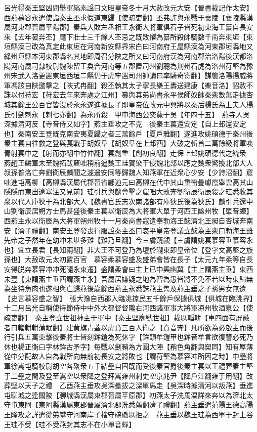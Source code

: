 呂光得秦王堅凶問舉軍縞素諡曰文昭皇帝冬十月大赦改元大安【晉書載記作太安】　西燕慕容永遣使詣秦主丕求假道東歸【使疏吏翻】丕弗許與永戰于襄陵【襄陵縣漢屬河東郡晉屬平陽郡】秦兵大敗左丞相王永衛大將軍俱石子皆死初東海王纂自長安來【去年纂奔丕】麾下壯士三千餘人丕忌之既敗懼為纂所殺帥騎數千南奔東垣【東垣縣漢已改為真定此東垣在河南新安縣界宋白曰河南府王屋縣漢為河東郡垣縣地又絳州垣縣本河東郡縣名其地即周召分陜之所又曰河南府漢為河南郡治洛陽後漢都洛陽河南屬司隸校尉魏陳留王奐合河南等五郡置司州劉聰為荆州石虎為洛州苻堅為豫州宋武入洛更置東垣西垣二縣仍于虎牢置司州帥讀曰率騎奇寄翻】謀襲洛陽揚威將軍馮該自陜邀擊之【陜式冉翻】殺丕執其太子寧長樂王夀送建康【樂音洛】詔赦不誅以付苻宏【苻宏去年來奔處之江州】纂與其弟尚書永平侯師奴帥秦衆數萬走據杏城其餘王公百官皆沒於永永遂進據長子即皇帝位改元中興將以秦后楊氏為上夫人楊氏引劍刺永【刺七亦翻】為永所殺　甲申海西公奕薨于吳【年四十五】　燕寺人吳深據清河反【寺音侍又如字】燕主垂攻之不克　後秦主萇還安定【自上邽還安定也】秦南安王登既克南安夷夏歸之者三萬餘戶【夏戶雅翻】遂進攻姚碩德于秦州後秦主萇自往救之登與萇戰于胡奴阜【胡奴阜在上邽西】大破之斬首二萬餘級將軍啖青射萇中之【射而亦翻中竹仲翻】萇創重【創初良翻】走保上邽姚碩德代之統衆　燕趙王麟軍未至魏拓跋窟咄稍前逼魏王珪賀染干侵魏北部以應之魏衆驚擾北部大人叔孫普洛亡奔劉衛辰麟聞之遽遣安同等歸魏人知燕軍在近衆心少安【少詩沼翻】窟咄進屯高柳【高柳縣漢屬代郡晉省酈道元曰高柳在代中其山重巒疊巘霞舉雲高其山隱隱而東出遼塞注又見前】珪引兵與麟會擊之窟咄大敗奔劉衛辰衛辰殺之珪悉收其衆以代人庫狄干為北部大人【魏書官氏志次南諸部有庫狄氏後為狄氏】麟引兵還中山劉衛辰居朔方士馬甚盛後秦主萇以衛辰為大將軍大單于河西王幽州牧【單音蟬】西燕主永以衛辰為大將軍朔州牧十一月秦尚書寇遺奉勃海王懿濟北王昶自杏城奔南安【濟子禮翻】南安王登發喪行服諡秦主丕曰哀平皇帝登議立懿為主衆曰勃海王雖先帝之子然年在幼冲未堪多難【難乃旦翻】今三虜窺覦【三虜謂姚萇慕容垂慕容永也】宜立長君【長知兩翻】非大王不可登乃為壇於隴東即皇帝位【登字文高堅之族孫也】大赦改元太初置百官　慕容柔慕容盛及盛弟會皆在長子【太元九年柔等自長安得脱奔慕容冲冲死隨永東遷】盛謂柔會曰主上已中興幽冀【主上謂燕主垂】東西未壹【東謂燕主垂西謂燕主永】吾屬居嫌疑之地為智為愚皆將不免不若以時東歸無為坐待魚肉也遂相與亡歸燕後歲餘西燕主永悉誅燕主雋及燕主垂之子孫男女無遺【史言慕容盛之智】　張大豫自西郡入臨洮掠民五千餘戶保據俱城【俱城在臨洮界】　十二月呂光自稱使持節侍中中外大都督督隴右河西諸軍事大將軍凉州牧酒泉公【使疏吏翻】　秦主登立世祖神主于軍中【秦主堅廟號世祖】載以輜軿【車四面有屏蔽者曰輜軿軿蒲眠翻】建黄旗青蓋以虎賁三百人衛之【賁音奔】凡所欲為必啟主而後行引兵五萬東擊後秦將士皆刻鉾鎧為死休字【鉾頭牟鎧甲也鉾音牟言欲復讐必死乃休也楊正衡曰字林鉾古矛字】每戰以劍矟為方圓大陣【矟色角翻與槊同】知有厚薄從中分配故人自為戰所向無前初長安之將敗也【謂苻堅為慕容冲所困之時】中壘將軍徐嵩屯騎校尉胡空各聚衆五千結壘自固既而受後秦官爵後秦主萇以王禮葬秦主堅于二壘之間及登至嵩空以衆降之登拜嵩雍州刺史空京兆尹【降戶江翻雍于用翻】改葬堅以天子之禮　乙酉燕主垂攻吳深壘拔之深單馬走【吳深時據清河以叛燕】垂進屯聊城之逢關陂【聊城縣漢屬東郡晉屬平原郡】初燕太子洗馬温詳來奔以為濟北太守屯東阿【東阿縣漢屬東郡晉屬濟北郡洗悉薦翻濟子禮翻】燕主垂遣范陽王德高陽王隆攻之詳遣從弟攀守河南岸子楷守碻磝以拒之　燕主垂以魏王珪為西單于封上谷王珪不受【珪不受燕封其志不在小單音蟬】

